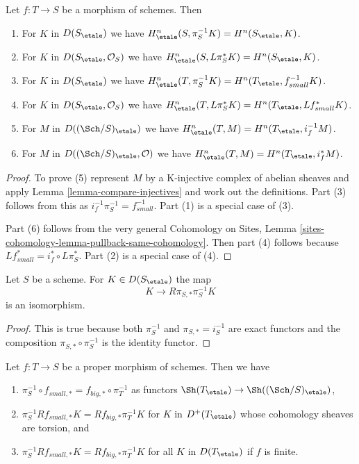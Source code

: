 \begin{lemma}
\label{lemma-compare-cohommology}
Let $f : T \to S$ be a morphism of schemes. Then
\begin{enumerate}
\item For $K$ in $D(S_\etale)$ we have
$H^n_\etale(S, \pi_S^{-1}K) = H^n(S_\etale, K)$.
\item For $K$ in $D(S_\etale, \mathcal{O}_S)$ we have
$H^n_\etale(S, L\pi_S^*K) = H^n(S_\etale, K)$.
\item For $K$ in $D(S_\etale)$ we have
$H^n_\etale(T, \pi_S^{-1}K) = H^n(T_\etale, f_{small}^{-1}K)$.
\item For $K$ in $D(S_\etale, \mathcal{O}_S)$ we have
$H^n_\etale(T, L\pi_S^*K) = H^n(T_\etale, Lf_{small}^*K)$.
\item For $M$ in $D((\Sch/S)_\etale)$ we have
$H^n_\etale(T, M) = H^n(T_\etale, i_f^{-1}M)$.
\item For $M$ in $D((\Sch/S)_\etale, \mathcal{O})$ we have
$H^n_\etale(T, M) = H^n(T_\etale, i_f^*M)$.
\end{enumerate}
\end{lemma}

\begin{proof}
To prove (5) represent $M$ by a K-injective complex of abelian sheaves
and apply Lemma \ref{lemma-compare-injectives}
and work out the definitions. Part (3) follows from
this as $i_f^{-1}\pi_S^{-1} = f_{small}^{-1}$. Part (1) is a special
case of (3).

\medskip\noindent
Part (6) follows from the very general Cohomology on Sites, Lemma
\ref{sites-cohomology-lemma-pullback-same-cohomology}. Then part
(4) follows because $Lf_{small}^* = i_f^* \circ L\pi_S^*$.
Part (2) is a special case of (4).
\end{proof}

\begin{lemma}
\label{lemma-cohomological-descent-etale}
Let $S$ be a scheme. For $K \in D(S_\etale)$ the map
$$
K \longrightarrow R\pi_{S, *}\pi_S^{-1}K
$$
is an isomorphism.
\end{lemma}

\begin{proof}
This is true because both $\pi_S^{-1}$ and $\pi_{S, *} = i_S^{-1}$
are exact functors and the composition $\pi_{S, *} \circ \pi_S^{-1}$
is the identity functor.
\end{proof}

\begin{lemma}
\label{lemma-compare-higher-direct-image-proper}
Let $f : T \to S$ be a proper morphism of schemes. Then we have
\begin{enumerate}
\item $\pi_S^{-1} \circ f_{small, *} = f_{big, *} \circ \pi_T^{-1}$
as functors $\Sh(T_\etale) \to \Sh((\Sch/S)_\etale)$,
\item $\pi_S^{-1}Rf_{small, *}K = Rf_{big, *}\pi_T^{-1}K$
for $K$ in $D^+(T_\etale)$ whose cohomology sheaves are torsion, and
\item $\pi_S^{-1}Rf_{small, *}K = Rf_{big, *}\pi_T^{-1}K$
for all $K$ in $D(T_\etale)$ if $f$ is finite.
\end{enumerate}
\end{lemma}

